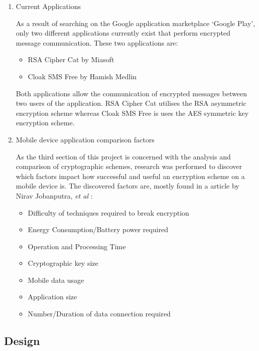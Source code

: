 \documentclass[a4paper,11pt]{article}
\begin{document}
\begin{enumerate}
  \item
  \begin{description}
    \item[Current Applications] 
  \end{description}
  As a result of searching on the Google application marketplace ‘Google Play’, only two different applications currently exist that perform encrypted message communication. These two applications are:
  \begin{itemize}
    \item RSA Cipher Cat by Miasoft \cite{rsaciphercat}
    \item Cloak SMS Free by Hamish Medlin \cite{cloacksms}
  \end{itemize}
  Both applications allow the communication of encrypted messages between two users of the application. RSA Cipher Cat utilises the RSA asymmetric encryption scheme whereas Cloak SMS Free is uses the AES symmetric key encryption scheme.
  \item
  \begin{description}
    \item[Mobile device application comparison factors] 
  \end{description}
  As the third section of this project is concerned with the analysis and comparison of cryptographic schemes, research was performed to discover which factors impact how successful and useful an encryption scheme on a mobile device is. The discovered factors are, mostly found in a article by Nirav Jobanputra, \textit{et al} \cite{ejeta}:
  \begin{itemize}
    \item Difficulty of techniques required to break encryption
    \item Energy Consumption/Battery power required
    \item Operation and Processing Time
    \item Cryptographic key size
    \item Mobile data usage
    \item Application size
    \item Number/Duration of data connection required
  \end{itemize}
\end{enumerate}

\subsection{Design}
\end{document}
